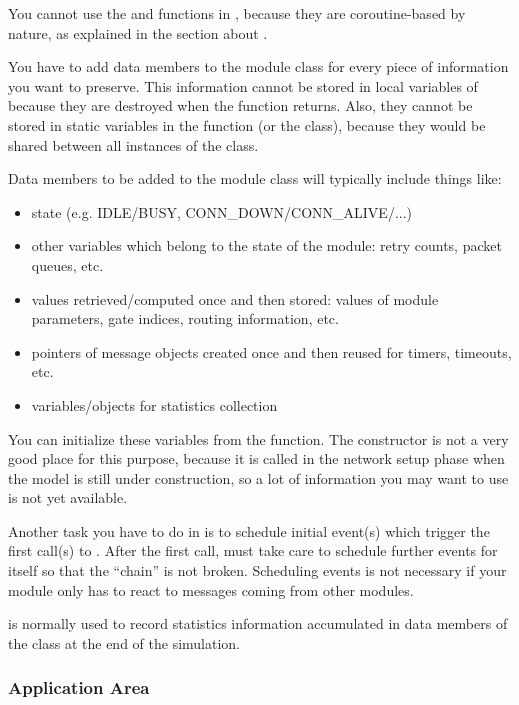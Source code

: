 You cannot use the  and
 functions in , because they are
coroutine-based by nature, as explained in the section about
.

You have to add data members to the module class for every piece
of information you want to preserve. This information cannot
be stored in local variables of  because they
are destroyed when the function returns. Also, they cannot be
stored in static variables in the function (or the class), because
they would be shared between all instances of the class.


Data members to be added to the module class will typically include
things like:

\begin{itemize}
  \item{state (e.g. IDLE/BUSY, CONN\_DOWN/CONN\_ALIVE/...)}
  \item{other variables which belong to the state of the module: retry
    counts, packet queues, etc.}
  \item{values retrieved/computed once and then stored: values of module
    parameters, gate indices, routing information, etc.}
  \item{pointers of message objects created once and then reused for
    timers, timeouts, etc.}
  \item{variables/objects for statistics collection}
\end{itemize}

You can initialize these variables from the 
function.  The constructor is not a very good place
for this purpose, because it is called in the network setup phase when
the model is still under construction, so a lot of information you may
want to use is not yet available.

Another task you have to do in  is to schedule
initial event(s) which trigger the first call(s)
to .  After the first call,
 must take care to schedule further events for
itself so that the ``chain'' is not broken. Scheduling events is not
necessary if your module only has to react to messages coming from
other modules.

 is normally used to record statistics information
accumulated in data members of the class at the end of the simulation.


\subsubsection{Application Area}


